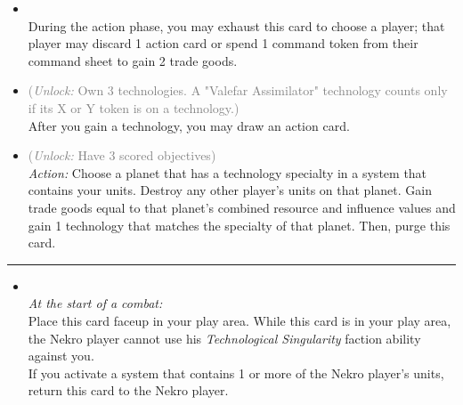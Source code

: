 \begin{multicols}{2}

\begin{itemize}
\item {}\\
During the action phase, you may exhaust this card to choose a player; that player may discard 1 action card or spend 1 command token from their command sheet to gain 2 trade goods.
\item {} \textcolor{gray}{(\emph{Unlock:} Own 3 technologies. A "Valefar Assimilator" technology counts only if its X or Y token is on a technology.)}\\
After you gain a technology, you may draw an action card.
\item {} \textcolor{gray}{(\emph{Unlock:} Have 3 scored objectives)}\\
\emph{Action:} Choose a planet that has a technology specialty in a system that contains your units. Destroy any other player's units on that planet. Gain trade goods equal to that planet's combined resource and influence values and gain 1 technology that matches the specialty of that planet. Then, purge this card.
\end{itemize}

\vspace{-10pt}\rule{\hsize}{0.4pt}\vspace{5pt}


\begin{itemize}
\item {}\\
\emph{At the start of a combat:}\\
Place this card faceup in your play area. While this card is in your play area, the Nekro player cannot use his \emph{Technological Singularity} faction ability against you.\\
If you activate a system that contains 1 or more of the Nekro player's units, return this card to the Nekro player.
\end{itemize}

\end{multicols}



